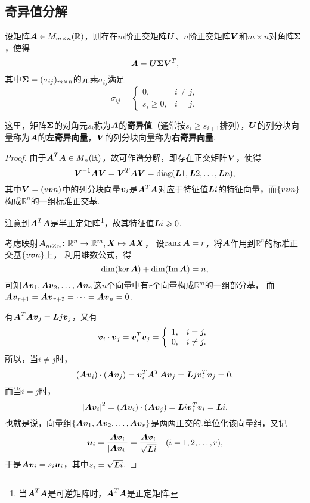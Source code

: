 \subsection{奇异值分解}
\begin{theorem}
\def\U{\mat{U}}
\def\S{\mat{\Sigma}}
\def\V{\mat{V}}
\let\Q\V
\let\P\U
\def\p{\mat{u}}
\def\q{\mat{v}}
设矩阵\(\boldsymbol{A} \in M_{m \times n}(\mathbb{R})\)，则存在\(m\)阶正交矩阵\(\U\)、\(n\)阶正交矩阵\(\V\)和\(m \times n\)对角阵\(\S\)，使得\[
\A = \U \S \V^T,
\]其中\(\S = (\sigma_{ij})_{m \times n}\)的元素\(\sigma_{ij}\)满足\[
\sigma_{ij} = \left\{ \begin{array}{cc}
0, & i \neq j, \\
s_i \geqslant 0, & i = j.
\end{array} \right.
\]

这里，矩阵\(\S\)的对角元\(s_i\)称为\(\boldsymbol{A}\)的\textbf{奇异值}（通常按\(s_i \geqslant s_{i+1}\)排列），\(\U\)的列分块向量称为\(\boldsymbol{A}\)的\textbf{左奇异向量}，\(\V\)的列分块向量称为\textbf{右奇异向量}.
\begin{proof}
由于\(\boldsymbol{A}^T \boldsymbol{A} \in M_n(\mathbb{R})\)，故可作谱分解，即存在正交矩阵\(\Q\)，使得\[
\Q^{-1}\A\Q = \Q^T\A\Q = \diag(\L{1},\L{2},\dotsc,\L{n}),
\]其中\(\Q=(\v{\q}{n})\)中的列分块向量\(\q_i\)是\(\boldsymbol{A}^T \boldsymbol{A}\)对应于特征值\(\boldsymbol{L}{i}\)的特征向量，而\(\{\v{\q}{n}\}\)构成\(\mathbb{R}^n\)的一组标准正交基.

注意到\(\boldsymbol{A}^T \boldsymbol{A}\)是半正定矩阵\footnote{当\(\boldsymbol{A}^T \boldsymbol{A}\)是可逆矩阵时，\(\boldsymbol{A}^T \boldsymbol{A}\)是正定矩阵.}，故其特征值\(\boldsymbol{L}{i}\geqslant0\).

考虑映射\(\boldsymbol{A}_{m \times n}\colon \mathbb{R}^n \to \mathbb{R}^m, \boldsymbol{X} \mapsto \boldsymbol{A}\boldsymbol{X}\)，%
设\(\rank\boldsymbol{A} = r\)，将\(\boldsymbol{A}\)作用到\(\mathbb{R}^n\)的标准正交基\(\{\v{\q}{n}\}\)上，%
利用维数公式，得\[
\dim(\ker \boldsymbol{A}) + \dim(\Im \boldsymbol{A}) = n,
\]
可知\(\A\q_1,\A\q_2,\dotsc,\A\q_n\)这\(n\)个向量中有\(r\)个向量构成\(\mathbb{R}^m\)的一组部分基，%
而\(\A\q_{r+1} = \A\q_{r+2} = \dotsb = \A\q_n = 0\).

有\(\A^T \A \q_j = \L{j} \q_j\)，又有\[
\q_i \cdot \q_j = \q_i^T \q_j
= \left\{ \begin{array}{lc}
1, & i=j, \\
0, & i \neq j.
\end{array} \right.
\]所以，当\(i \neq j\)时，\[
(\A\q_i)\cdot(\A\q_j) = \q_i^T \A^T \A \q_j = \L{j} \q_i^T \q_j = 0;
\]而当\(i = j\)时，\[
\abs{\A\q_i}^2 = (\A\q_i)\cdot(\A\q_j) = \L{i} \q_i^T \q_i = \L{i}.
\]也就是说，向量组\(\{\A\q_1,\A\q_2,\dotsc,\A\q_r\}\)是两两正交的.单位化该向量组，又记\[
\p_i = \frac{\A\q_i}{\abs{\A\q_i}}
= \frac{\A\q_i}{\sqrt{\L{i}}}
\quad(i=1,2,\dotsc,r),
\]于是\(\A\q_i = s_i \p_i\)，其中\(s_i = \sqrt{\boldsymbol{L}{i}}\).


\end{proof}
\end{theorem}
